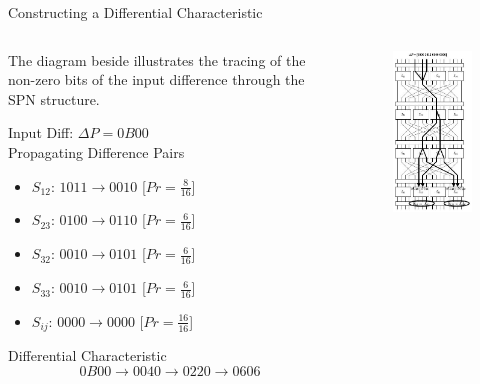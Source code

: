 \documentclass[9pt]{beamer}
\begin{document}
\begin{frame}
Constructing a Differential Characteristic

\begin{columns}
\begin{column}{0.6\textwidth}

The diagram beside illustrates the tracing of the non-zero bits of the input difference through the SPN structure.

Input Diff: $\Delta P = 0B00$ \\

Propagating Difference Pairs
\begin{itemize}
\item{$S_{12}$: $1011 \rightarrow 0010$ [$Pr = \frac{8}{16}$]}
\item{$S_{23}$: $0100 \rightarrow 0110$ [$Pr = \frac{6}{16}$]}
\item{$S_{32}$: $0010 \rightarrow 0101$ [$Pr = \frac{6}{16}$]}
\item{$S_{33}$: $0010 \rightarrow 0101$ [$Pr = \frac{6}{16}$]}
\item{$S_{ij}$: $0000 \rightarrow 0000$ [$Pr = \frac{16}{16}$]}
\end{itemize}

Differential Characteristic
\[ 0B00 \rightarrow 0040 \rightarrow 0220 \rightarrow 0606 \]
\end{column}
\begin{column}{0.4\textwidth}
\begin{figure}
\includegraphics[totalheight=0.8\textheight]{spn_diff_char.jpg}
\end{figure}
\end{column}
\end{columns}
\end{frame}
\end{document}
